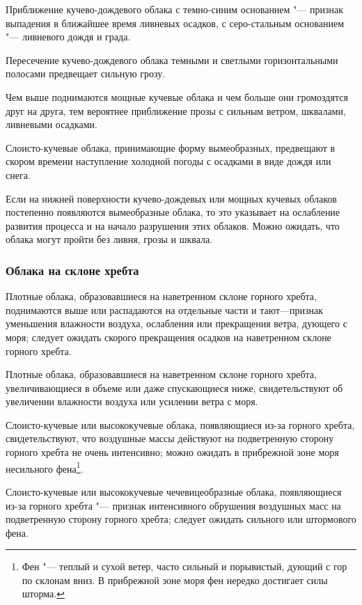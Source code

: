  Приближение кучево-дождевого облака с темно-синим основанием "---
признак выпадения в ближайшее время ливневых осадков, с серо-стальным
основанием "--- ливневого дождя и града.

 Пересечение кучево-дождевого облака темными и светлыми
горизонтальными полосами предвещает сильную грозу.

 Чем выше поднимаются мощные кучевые облака и чем больше они
громоздятся друг на друга, тем вероятнее приближение прозы с сильным
ветром, шквалами, ливневыми осадками.

 Слоисто-кучевые облака, принимающие форму вымеобразных,
предвещают в скором времени наступление холодной погоды с осадками в
виде дождя или снега.

 Если на нижней поверхности кучево-дождевых или мощных кучевых
облаков постепенно появляются вымеобразные облака, то это указывает на
ослабление развития процесса и на начало разрушения этих
облаков. Можно ожидать, что облака могут пройти без ливня, грозы и
шквала.

\subsubsection{Облака на склоне хребта}

 Плотные облака, образовавшиеся на наветренном склоне горного
хребта, поднимаются выше или распадаются на отдельные части и
тают—признак уменьшения влажности воздуха, ослабления или прекращения
ветра, дующего с моря; следует ожидать скорого прекращения осадков на
наветренном склоне горного хребта.

 Плотные облака, образовавшиеся на наветренном склоне горного
хребта, увеличивающиеся в объеме или даже спускающиеся ниже,
свидетельствуют об увеличении влажности воздуха или усилении ветра с
моря.

 Слоисто-кучевые или высококучевые облака, появляющиеся из-за
горного хребта, свидетельствуют, что воздушные массы действуют на
подветренную сторону горного хребта не очень интенсивно; можно ожидать
в прибрежной зоне моря несильного фена\footnote{Фен "--- теплый и
  сухой ветер, часто сильный и порывистый, дующий с гор по склонам
  вниз. В прибрежной зоне моря фен нередко достигает силы шторма.}.

 Слоисто-кучевые или высококучевые чечевицеобразные облака,
появляющиеся из-за горного хребта "--- признак интенсивного обрушения
воздушных масс на подветренную сторону горного хребта; следует ожидать
сильного или штормового фена.


